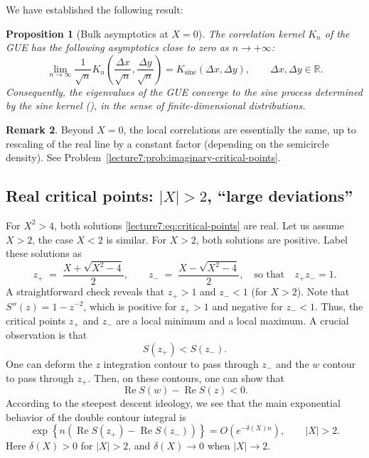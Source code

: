 \documentclass[letterpaper,11pt,oneside,reqno]{book}
\numberwithin{equation}{chapter}  %
\newtheorem{proposition}{Proposition}[chapter]  %
\theoremstyle{definition}
\newtheorem{remark}[proposition]{Remark}
\begin{document}
We have established the following result:
\begin{proposition}[Bulk asymptotics at $X=0$]
	\label{lecture7:prop:bulk}
	The correlation kernel $K_n$ of the GUE has the following asymptotics
	close to zero as $n\to+\infty$:
	\begin{equation*}
		\lim_{n\to \infty}
		\frac{1}{\sqrt n}
		K_n\left( \frac{\Delta x}{\sqrt n},\frac{\Delta y}{\sqrt n} \right)
		=
		K_{\mathrm{sine}}\left( \Delta x,\Delta y \right),
		\qquad \Delta x,\Delta y\in\mathbb{R}.
	\end{equation*}
	Consequently, the eigenvalues of the GUE converge to the sine process
	determined by the sine kernel (),
	in the sense of finite-dimensional distributions.
\end{proposition}

\begin{remark}
	Beyond $X=0$, the local correlations are essentially the same,
	up to rescaling of the real line by a constant factor (depending
	on the semicircle density).
	See Problem~\ref{lecture7:prob:imaginary-critical-points}.
\end{remark}

\subsection{Real critical points: \texorpdfstring{$|X|>2$, ``large deviations''}{|X|>2, large deviations}}
\label{lecture7:sub:real-critical-points}

For \(X^2>4\), both solutions
\eqref{lecture7:eq:critical-points}
are real. Let us assume $X>2$, the case \(X<2\) is similar.
For $X>2$, both solutions are positive.
Label these solutions as
\[
	z_+ \;=\;\frac{X + \sqrt{X^2-4}}{2},
	\qquad
	z_- \;=\;\frac{X - \sqrt{X^2-4}}{2},
	\quad
	\text{so that}\quad z_+z_-=1.
\]
A straightforward check reveals that \(z_+\!>\!1\) and \(z_-\!<\!1\) (for \(X>2\)).
Note that $S''(z)=1-z^{-2}$, which is positive for \(z_+>1\) and negative for \(z_-<1\).  Thus, the critical points \(z_+\) and \(z_-\) are a local minimum and a local maximum.
A crucial observation is that
\begin{equation*}
	S(z_+)<S(z_-).
\end{equation*}
One can deform the $z$ integration contour to pass through
$z_-$ and the $w$ contour to pass through $z_+$.
Then, on these contours, one can show that
\begin{equation*}
	\operatorname{Re}S(w)-\operatorname{Re}S(z)<0.
\end{equation*}
According to the steepest descent ideology,
we see that the main exponential behavior of the double contour integral is
\begin{equation}
	\label{lecture7:eq:Oexp}
	\exp\left\{ n\left(
		\operatorname{Re}S(z_+)-\operatorname{Re}S(z_-)
\right) \right\}=O( e^{-\delta(X)n} ), \qquad |X|>2.
\end{equation}
Here $\delta(X)>0$ for $|X|>2$, and $\delta(X)\to0$ when $|X|\to2$.
\end{document}

